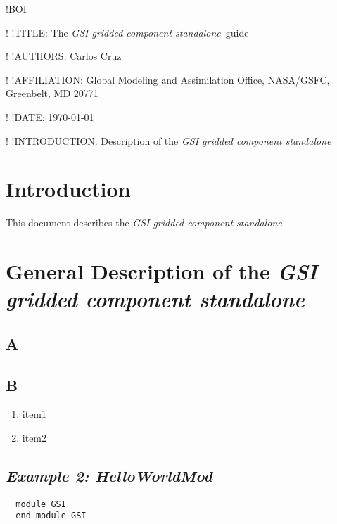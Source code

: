 !BOI

\newcommand{\aana}{{\em GEOS aana}}
\newcommand{\gsisa}{{\em GSI gridded component standalone}}
\newcommand{\gsi}{{\em GSI gridded component}}
\newcommand{\ptx}{{\tt protex}}

!  !TITLE: The \gsisa\ guide 

!  !AUTHORS: Carlos Cruz

!  !AFFILIATION: {Global Modeling and Assimilation Office, NASA/GSFC, Greenbelt, MD 20771}

!  !DATE: \today

!  !INTRODUCTION: Description of the \gsisa

\setlength{\parskip}{12pt}
\section{Introduction}

This document describes the \gsisa


\section{General Description of the \gsisa}

\subsection{A}

\subsection{B}

\begin{enumerate}

\item item1 
\item item2 

\end{enumerate}

\subsection{\em Example 2: HelloWorldMod}
  
\footnotesize
\begin{verbatim}
  module GSI
  end module GSI
\end{verbatim}
\normalsize


